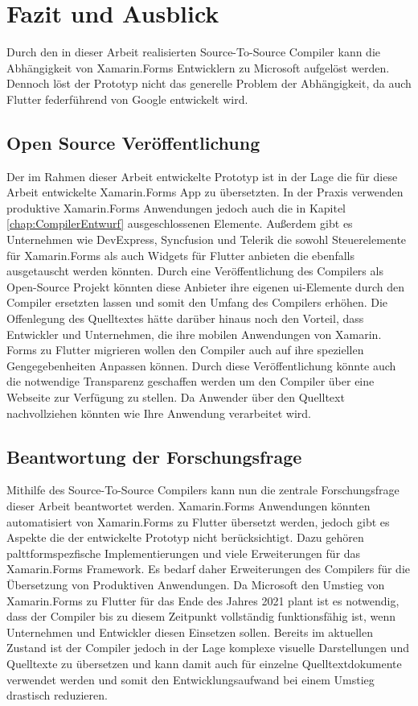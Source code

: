 \chapter{Fazit und Ausblick}
\label{chap:FazitAusblick}

Durch den in dieser Arbeit realisierten Source-To-Source Compiler kann die Abhängigkeit von Xamarin.Forms Entwicklern zu Microsoft aufgelöst werden.  Dennoch löst der Prototyp nicht das generelle Problem der Abhängigkeit,  da auch Flutter federführend von Google entwickelt wird.  


\section{Open Source Veröffentlichung}
Der im Rahmen dieser Arbeit entwickelte Prototyp ist in der Lage die für diese Arbeit entwickelte Xamarin.Forms App zu übersetzten.  In der Praxis verwenden produktive Xamarin.Forms Anwendungen jedoch auch die in Kapitel \ref{chap:CompilerEntwurf} ausgeschlossenen Elemente.  Außerdem gibt es Unternehmen wie DevExpress, Syncfusion und Telerik die sowohl Steuerelemente für Xamarin.Forms als auch Widgets für Flutter anbieten die ebenfalls ausgetauscht werden könnten.  Durch eine Veröffentlichung des Compilers als Open-Source Projekt könnten diese Anbieter ihre eigenen \ac{ui}-Elemente durch den Compiler ersetzten lassen und somit den Umfang des Compilers erhöhen.  Die Offenlegung des Quelltextes hätte darüber hinaus noch den Vorteil, dass Entwickler und Unternehmen, die ihre mobilen Anwendungen von Xamarin. Forms zu Flutter migrieren wollen den Compiler auch auf ihre speziellen Gengegebenheiten Anpassen können. 
Durch diese Veröffentlichung könnte auch die notwendige Transparenz geschaffen werden um den Compiler über eine Webseite zur Verfügung zu stellen.  Da Anwender über den Quelltext nachvollziehen könnten wie Ihre Anwendung verarbeitet wird.  

\section{Beantwortung der Forschungsfrage}
Mithilfe des Source-To-Source Compilers kann nun die zentrale Forschungsfrage dieser Arbeit beantwortet werden.  Xamarin.Forms Anwendungen könnten automatisiert von Xamarin.Forms zu Flutter übersetzt werden,  jedoch gibt es Aspekte die der entwickelte Prototyp nicht berücksichtigt.  Dazu gehören palttformspezfische Implementierungen und viele Erweiterungen für das Xamarin.Forms Framework.  Es bedarf daher Erweiterungen des Compilers für die Übersetzung von Produktiven Anwendungen.  Da Microsoft den Umstieg von Xamarin.Forms zu Flutter für das Ende des Jahres 2021 plant ist es notwendig,  dass der Compiler bis zu diesem Zeitpunkt vollständig funktionsfähig ist,  wenn Unternehmen und Entwickler diesen Einsetzen sollen.  Bereits im aktuellen Zustand ist der Compiler jedoch in der Lage komplexe visuelle Darstellungen und Quelltexte zu übersetzen und kann damit auch für einzelne Quelltextdokumente verwendet werden und somit den Entwicklungsaufwand bei einem Umstieg drastisch reduzieren. 

